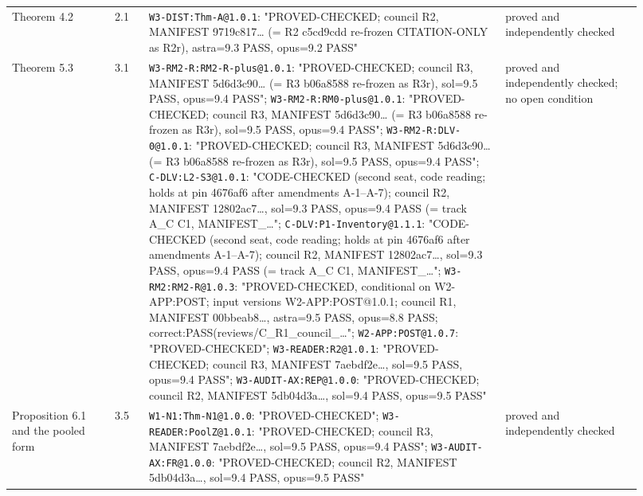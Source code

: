 \begin{longtable}{@{}p{0.15\linewidth}p{0.05\linewidth}p{0.52\linewidth}p{0.2\linewidth}@{}}
Theorem 4.2 & 2.1 & \texttt{W3-DIST:Thm-A@1.0.1}: "PROVED-CHECKED; council R2, MANIFEST 9719c817\ldots{} (= R2 c5cd9cdd re-frozen CITATION-ONLY as R2r), astra=9.3 PASS, opus=9.2 PASS" & proved and independently checked \\
Theorem 5.3 & 3.1 & \texttt{W3-RM2-R:RM2-R-plus@1.0.1}: "PROVED-CHECKED; council R3, MANIFEST 5d6d3c90\ldots{} (= R3 b06a8588 re-frozen as R3r), sol=9.5 PASS, opus=9.4 PASS"; \texttt{W3-RM2-R:RM0-plus@1.0.1}: "PROVED-CHECKED; council R3, MANIFEST 5d6d3c90\ldots{} (= R3 b06a8588 re-frozen as R3r), sol=9.5 PASS, opus=9.4 PASS"; \texttt{W3-RM2-R:DLV-0@1.0.1}: "PROVED-CHECKED; council R3, MANIFEST 5d6d3c90\ldots{} (= R3 b06a8588 re-frozen as R3r), sol=9.5 PASS, opus=9.4 PASS"; \texttt{C-DLV:L2-S3@1.0.1}: "CODE-CHECKED (second seat, code reading; holds at pin 4676af6 after amendments A-1--A-7); council R2, MANIFEST 12802ac7\ldots{}, sol=9.3 PASS, opus=9.4 PASS (= track A\_C C1, MANIFEST\_\ldots{}"; \texttt{C-DLV:P1-Inventory@1.1.1}: "CODE-CHECKED (second seat, code reading; holds at pin 4676af6 after amendments A-1--A-7); council R2, MANIFEST 12802ac7\ldots{}, sol=9.3 PASS, opus=9.4 PASS (= track A\_C C1, MANIFEST\_\ldots{}"; \texttt{W3-RM2:RM2-R@1.0.3}: "PROVED-CHECKED, conditional on W2-APP:POST; input versions W2-APP:POST@1.0.1; council R1, MANIFEST 00bbeab8\ldots{}, astra=9.5 PASS, opus=8.8 PASS; correct:PASS(reviews/C\_R1\_council\_\ldots{}"; \texttt{W2-APP:POST@1.0.7}: "PROVED-CHECKED"; \texttt{W3-READER:R2@1.0.1}: "PROVED-CHECKED; council R3, MANIFEST 7aebdf2e\ldots{}, sol=9.5 PASS, opus=9.4 PASS"; \texttt{W3-AUDIT-AX:REP@1.0.0}: "PROVED-CHECKED; council R2, MANIFEST 5db04d3a\ldots{}, sol=9.4 PASS, opus=9.5 PASS" & proved and independently checked; no open condition \\
Proposition 6.1 and the pooled form & 3.5 & \texttt{W1-N1:Thm-N1@1.0.0}: "PROVED-CHECKED"; \texttt{W3-READER:PoolZ@1.0.1}: "PROVED-CHECKED; council R3, MANIFEST 7aebdf2e\ldots{}, sol=9.5 PASS, opus=9.4 PASS"; \texttt{W3-AUDIT-AX:FR@1.0.0}: "PROVED-CHECKED; council R2, MANIFEST 5db04d3a\ldots{}, sol=9.4 PASS, opus=9.5 PASS" & proved and independently checked \\

\end{longtable}
